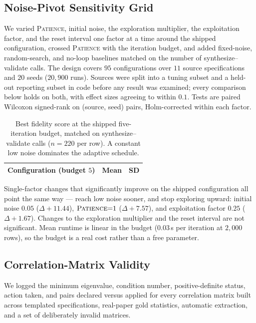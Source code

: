 \documentclass[letterpaper]{article} %
\begin{document}
\subsection{Noise-Pivot Sensitivity Grid}
\label{app:pivotgrid}
We varied \textsc{Patience}, initial noise, the exploration multiplier, the
exploitation factor, and the reset interval one factor at a time around the
shipped configuration, crossed \textsc{Patience} with the iteration budget, and
added fixed-noise, random-search, and no-loop baselines matched on the number of
synthesize--validate calls. The design covers $95$ configurations over $11$
source specifications and $20$ seeds ($20{,}900$ runs). Sources were split into
a tuning subset and a held-out reporting subset in code before any result was
examined; every comparison below holds on both, with effect sizes agreeing to
within $0.1$. Tests are paired Wilcoxon signed-rank on (source, seed) pairs,
Holm-corrected within each factor.

\begin{table}[t]
\centering
\setlength{\tabcolsep}{4pt}
\begin{tabular}{lrr}
\toprule
Configuration (budget $5$) & Mean & SD \\
\midrule
%
\end{tabular}
\caption{Best fidelity score at the shipped five-iteration budget, matched on
synthesize--validate calls ($n{=}220$ per row). A constant low noise dominates
the adaptive schedule.}
\label{tab:pivotbaselines}
\end{table}

Single-factor changes that significantly improve on the shipped configuration
all point the same way --- reach low noise sooner, and stop exploring upward:
initial noise $0.05$ ($\Delta{+}11.44$), $\textsc{Patience}{=}1$
($\Delta{+}7.57$), and exploitation factor $0.25$ ($\Delta{+}1.67$). Changes to
the exploration multiplier and the reset interval are not significant. Mean
runtime is linear in the budget ($0.03$\,s per iteration at $2{,}000$ rows), so
the budget is a real cost rather than a free parameter.

\subsection{Correlation-Matrix Validity}
\label{app:corrvalidity}
We logged the minimum eigenvalue, condition number, positive-definite status,
action taken, and pairs declared versus applied for every correlation matrix
built across templated specifications, real-paper gold statistics, automatic
extraction, and a set of deliberately invalid matrices.
\end{document}
